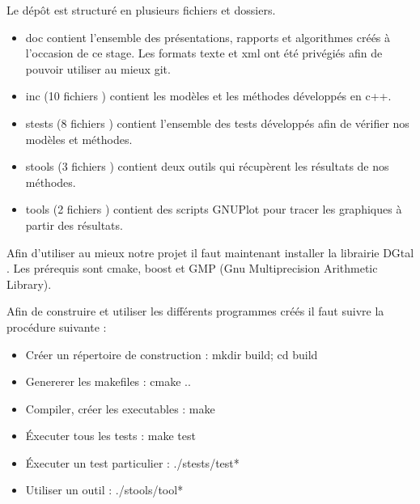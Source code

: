 Le dépôt est structuré en plusieurs fichiers et dossiers.

\begin{itemize}
  \item doc contient l'ensemble des présentations, rapports et algorithmes créés à l'occasion de ce stage. Les formats texte et xml ont été privégiés afin de pouvoir utiliser au mieux git.
  \item inc (10 fichiers ) contient les modèles et les méthodes développés en c++. 
  \item stests (8 fichiers ) contient l'ensemble des tests développés afin de vérifier nos modèles et méthodes.
  \item stools (3 fichiers ) contient deux outils qui récupèrent les résultats de nos méthodes.
  \item tools (2 fichiers ) contient des scripts GNUPlot pour tracer les graphiques à partir des résultats.
\end{itemize}

Afin d'utiliser au mieux notre projet il faut maintenant installer la librairie DGtal \cite{DGtal}. Les prérequis sont cmake, boost et GMP (Gnu Multiprecision Arithmetic Library). 

Afin de construire et utiliser les différents programmes créés il faut suivre la procédure suivante :

\begin{itemize}
  \item Créer un répertoire de construction : mkdir build; cd build
  \item Genererer les makefiles : cmake ..
  \item Compiler, créer les executables : make
  \item Éxecuter tous les tests : make test
  \item Éxecuter un test particulier : ./stests/test*
  \item Utiliser un outil : ./stools/tool*
\end{itemize}

